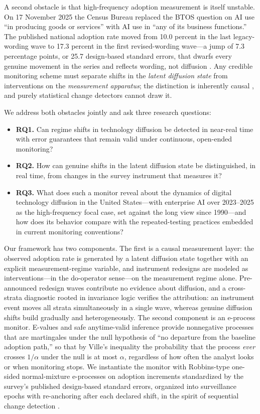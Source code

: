 \documentclass[review,authoryear,12pt]{elsarticle}
\begin{document}
A second obstacle is that high-frequency adoption measurement is itself unstable. On 17 November 2025 the Census Bureau replaced the BTOS question on AI use ``in producing goods or services'' with AI use in ``any of its business functions.'' The published national adoption rate moved from 10.0 percent in the last legacy-wording wave to 17.3 percent in the first revised-wording wave---a jump of 7.3 percentage points, or 25.7 design-based standard errors, that dwarfs every genuine movement in the series and reflects wording, not diffusion \citep{bick2026}. Any credible monitoring scheme must separate shifts in the \emph{latent diffusion state} from interventions on the \emph{measurement apparatus}; the distinction is inherently causal \citep{pearl2009}, and purely statistical change detectors cannot draw it.

We address both obstacles jointly and ask three research questions:
\begin{itemize}
\item \textbf{RQ1.} Can regime shifts in technology diffusion be detected in near-real time with error guarantees that remain valid under continuous, open-ended monitoring?
\item \textbf{RQ2.} How can genuine shifts in the latent diffusion state be distinguished, in real time, from changes in the survey instrument that measures it?
\item \textbf{RQ3.} What does such a monitor reveal about the dynamics of digital technology diffusion in the United States---with enterprise AI over 2023--2025 as the high-frequency focal case, set against the long view since 1990---and how does its behavior compare with the repeated-testing practices embedded in current monitoring conventions?
\end{itemize}

Our framework has two components. The first is a causal measurement layer: the observed adoption rate is generated by a latent diffusion state together with an explicit measurement-regime variable, and instrument redesigns are modeled as interventions---in the do-operator sense---on the measurement regime alone. Pre-announced redesign waves contribute no evidence about diffusion, and a cross-strata diagnostic rooted in invariance logic \citep{peters2016,rothenhausler2021} verifies the attribution: an instrument event moves all strata simultaneously in a single wave, whereas genuine diffusion shifts build gradually and heterogeneously. The second component is an e-process monitor. E-values and safe anytime-valid inference \citep{shafer2019,vovk2021,howard2021,ramdas2023,grunwald2024} provide nonnegative processes that are martingales under the null hypothesis of ``no departure from the baseline adoption path,'' so that by Ville's inequality the probability that the process \emph{ever} crosses $1/\alpha$ under the null is at most $\alpha$, regardless of how often the analyst looks or when monitoring stops. We instantiate the monitor with Robbins-type one-sided normal-mixture e-processes \citep{robbins1970} on adoption increments standardized by the survey's published design-based standard errors, organized into surveillance epochs with re-anchoring after each declared shift, in the spirit of sequential change detection \citep{page1954,shin2023}.
\end{document}
